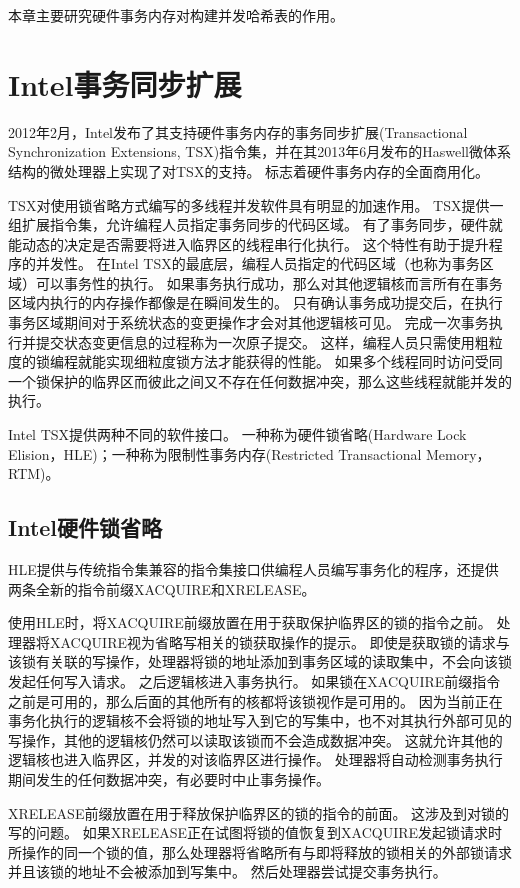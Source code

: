 本章主要研究硬件事务内存对构建并发哈希表的作用。

\section{Intel事务同步扩展}
2012年2月，Intel发布了其支持硬件事务内存的事务同步扩展(Transactional Synchronization Extensions, TSX)指令集，并在其2013年6月发布的Haswell微体系结构的微处理器上实现了对TSX的支持。
标志着硬件事务内存的全面商用化。

TSX对使用锁省略方式编写的多线程并发软件具有明显的加速作用。 
TSX提供一组扩展指令集，允许编程人员指定事务同步的代码区域。
有了事务同步，硬件就能动态的决定是否需要将进入临界区的线程串行化执行。
这个特性有助于提升程序的并发性。
在Intel TSX的最底层，编程人员指定的代码区域（也称为事务区域）可以事务性的执行。
如果事务执行成功，那么对其他逻辑核而言所有在事务区域内执行的内存操作都像是在瞬间发生的。
只有确认事务成功提交后，在执行事务区域期间对于系统状态的变更操作才会对其他逻辑核可见。
完成一次事务执行并提交状态变更信息的过程称为一次原子提交。
这样，编程人员只需使用粗粒度的锁编程就能实现细粒度锁方法才能获得的性能。
如果多个线程同时访问受同一个锁保护的临界区而彼此之间又不存在任何数据冲突，那么这些线程就能并发的执行。

Intel TSX提供两种不同的软件接口。
一种称为硬件锁省略(Hardware Lock Elision，HLE)；一种称为限制性事务内存(Restricted Transactional Memory，RTM)。

\subsection{Intel硬件锁省略}
HLE提供与传统指令集兼容的指令集接口供编程人员编写事务化的程序，还提供两条全新的指令前缀XACQUIRE和XRELEASE。

使用HLE时，将XACQUIRE前缀放置在用于获取保护临界区的锁的指令之前。
处理器将XACQUIRE视为省略写相关的锁获取操作的提示。
即使是获取锁的请求与该锁有关联的写操作，处理器将锁的地址添加到事务区域的读取集中，不会向该锁发起任何写入请求。
之后逻辑核进入事务执行。
如果锁在XACQUIRE前缀指令之前是可用的，那么后面的其他所有的核都将该锁视作是可用的。
因为当前正在事务化执行的逻辑核不会将锁的地址写入到它的写集中，也不对其执行外部可见的写操作，其他的逻辑核仍然可以读取该锁而不会造成数据冲突。
这就允许其他的逻辑核也进入临界区，并发的对该临界区进行操作。
处理器将自动检测事务执行期间发生的任何数据冲突，有必要时中止事务操作。

XRELEASE前缀放置在用于释放保护临界区的锁的指令的前面。
这涉及到对锁的写的问题。
如果XRELEASE正在试图将锁的值恢复到XACQUIRE发起锁请求时所操作的同一个锁的值，那么处理器将省略所有与即将释放的锁相关的外部锁请求并且该锁的地址不会被添加到写集中。
然后处理器尝试提交事务执行。

